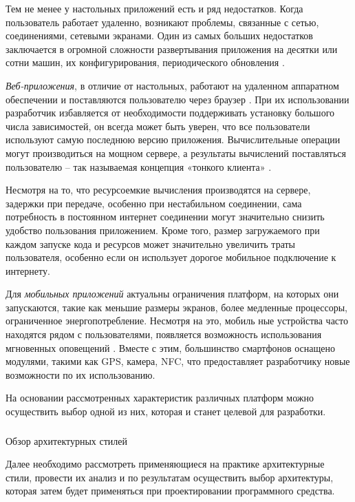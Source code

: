 Тем не менее у настольных приложений есть и ряд недостатков. Когда пользователь работает удаленно, возникают проблемы,
связанные с сетью, соединениями, сетевыми экранами. Один из самых больших недостатков заключается в огромной
сложности развертывания приложения на десятки или сотни машин, их конфигурирования, периодического обновления \cite{msdn_desktop_vs_web}.

\emph{Веб-приложения}, в отличие от настольных, работают на удаленном аппаратном обеспечении и поставляются пользователю
через браузер \cite{web_based_vs_desktop}. При их использовании разработчик избавляется от необходимости поддерживать
установку большого числа зависимостей, он всегда может быть уверен, что все пользователи используют самую последнюю
версию приложения. Вычислительные операции могут производиться на мощном сервере, а результаты вычислений поставляться
пользователю – так называемая концепция «тонкого клиента» \cite{desktop_vs_web_deeper_look}.

Несмотря на то, что ресурсоемкие вычисления производятся на сервере, задержки при передаче, особенно при нестабильном
соединении, сама потребность в постоянном интернет соединении могут значительно снизить удобство пользования
приложением. Кроме того, размер загружаемого при каждом запуске кода и ресурсов может значительно увеличить траты
пользователя, особенно если он использует дорогое мобильное подключение к интернету.

Для \emph{мобильных приложений} актуальны ограничения платформ, на которых они запускаются, такие как меньшие размеры
экранов, более медленные процессоры, ограниченное энергопотребление. Несмотря на это, мобиль ные устройства часто
находятся рядом с пользователями, появляется возможность использования мгновенных оповещений \cite{desktop_mobile_differences}.
Вместе с этим, большинство смартфонов оснащено модулями, такими как GPS, камера, NFC, что предоставляет разработчику
новые возможности по их использованию.

На основании рассмотренных характеристик различных платформ можно осуществить выбор одной из них, которая и станет
целевой для разработки.

\subsubsection{} Обзор архитектурных стилей
\label{sec:analysis:literature:architecture}

Далее необходимо рассмотреть применяющиеся на практике архитектурные стили, провести их анализ и по результатам
осуществить выбор архитектуры, которая затем будет применяться при проектировании программного средства.

